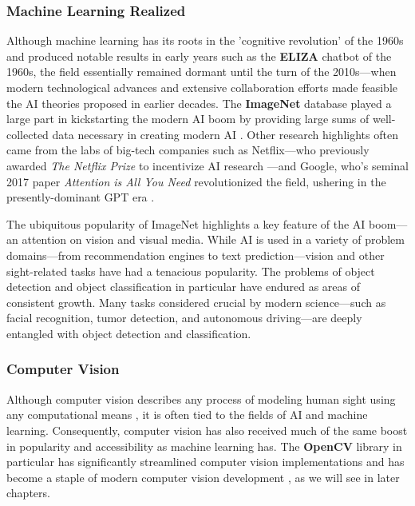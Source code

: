 \documentclass{report}
\newcommand{\tech}[1]{\textbf{#1}}
\begin{document}
\subsubsection{Machine Learning Realized}
Although machine learning has its roots in the 'cognitive revolution' of the 1960s \cite{MILLER2003141} and produced notable results in early years such as the \tech{ELIZA} chatbot of the 1960s, \cite{ELIZA} the field essentially remained dormant until the turn of the 2010s---when modern technological advances and extensive collaboration efforts made feasible the AI theories proposed in earlier decades. The \tech{ImageNet} database played a large part in kickstarting the modern AI boom by providing large sums of well-collected data necessary in creating modern AI \cite{Gershgorn_2017}. Other research highlights often came from the labs of big-tech companies such as Netflix---who previously awarded \emph{The Netflix Prize} to incentivize AI research \cite{netflix}---and Google, who's seminal 2017 paper \emph{Attention is All You Need} \cite{vaswani2023attentionneed} revolutionized the field, ushering in the presently-dominant GPT era \cite{Love_2023}.   

The ubiquitous popularity of ImageNet highlights a key feature of the AI boom---an attention on vision and visual media. While AI is used in a variety of problem domains---from recommendation engines to text prediction---vision and other sight-related tasks have had a tenacious popularity. The problems of object detection and object classification in particular have endured as areas of consistent growth. Many tasks considered crucial by modern science---such as facial recognition, tumor detection, and autonomous driving---are deeply entangled with object detection and classification.

\subsubsection{Computer Vision}
Although computer vision describes any process of modeling human sight using any computational means \cite{Huang1996ComputerVE}, it is often tied to the fields of AI and machine learning. Consequently, computer vision has also received much of the same boost in popularity and accessibility as machine learning has. The \tech{OpenCV} library in particular has significantly streamlined computer vision implementations and has become a staple of modern computer vision development \cite{culjak2012brief}, as we will see in later chapters.
\end{document}
